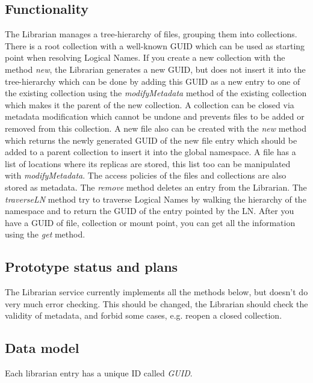 \documentclass{book}
\begin{document}
\subsection{Functionality} %
% 
The Librarian manages a tree-hierarchy of files, grouping them into collections. There is a root collection with a well-known GUID which can be used as starting point when resolving Logical Names. If you create a new collection with the method \emph{new}, the Librarian generates a new GUID, but does not insert it into the tree-hierarchy which can be done by adding this GUID as a new entry to one of the existing collection using the \emph{modifyMetadata} method of the existing collection which makes it the parent of the new collection. A collection can be closed via metadata modification which cannot be undone and prevents files to be added or removed from this collection. A new file  also can be created with the \emph{new} method which returns the newly generated GUID of the new file entry which should be added to a parent collection to insert it into the global namespace. A file has a list of locations where its replicas are stored, this list too can be manipulated with \emph{modifyMetadata}. The access policies of the files and collections are also stored as metadata. The \emph{remove} method deletes an entry from the Librarian. The \emph{traverseLN} method try to traverse Logical Names by walking the hierarchy of the namespace and to return the GUID of the entry pointed by the LN. After you have a GUID of file, collection or mount point, you can get all the information using the \emph{get} method. 


\subsection{Prototype status and plans} %

The Librarian service currently implements all the methods below, but doesn’t do very much error checking. This should be changed, the Librarian should check the validity of metadata, and forbid some cases, e.g. reopen a closed collection.


\subsection{Data model} %
\label{sub:data_model}
Each librarian entry has a unique ID called \emph{GUID}.
\end{document}
